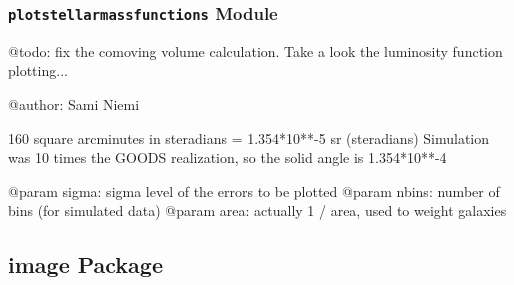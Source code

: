 \documentclass[letterpaper,10pt,english]{sphinxmanual}
\begin{document}
\begin{fulllineitems}
\label{SamPy.herschel:SamPy.herschel.plotssfrredshift.plot}
\end{fulllineitems}



\subsubsection{\texttt{plotstellarmassfunctions} Module}
\label{SamPy.herschel:plotstellarmassfunctions-module}\label{SamPy.herschel:module-SamPy.herschel.plotstellarmassfunctions}
@todo: fix the comoving volume calculation.
Take a look the luminosity function plotting...

@author: Sami Niemi


\begin{fulllineitems}
\label{SamPy.herschel:SamPy.herschel.plotstellarmassfunctions.plot_stellarmasses}
160 square arcminutes in steradians =
1.354*10**-5 sr (steradians)
Simulation was 10 times the GOODS realization, so
the solid angle is 1.354*10**-4

@param sigma: sigma level of the errors to be plotted
@param nbins: number of bins (for simulated data)
@param area: actually 1 / area, used to weight galaxies

\end{fulllineitems}



\subsection{image Package}
\label{SamPy.image::doc}\label{SamPy.image:image-package}
\end{document}
